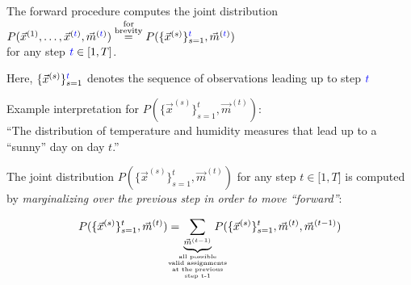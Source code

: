 \begin{frame}{\subsecname}

The forward procedure computes the joint distribution $P(\vec x^{(1)}, \ldots , \vec x^{({\color{blue}t})}, \vec m^{({\color{blue}t})}) \stackrel{\substack{\text{for}\\ \text{brevity}}}{=} P(\{\vec x^{(s)}\}_{s=1}^{{\color{blue}t}}, \vec m^{({\color{blue}t})})$\\
for any step ${\color{blue}t} \in \lbrack 1, T\rbrack$.\\

\svspace{5mm}

Here, $\{\vec x^{(s)}\}_{s=1}^{{\color{blue}t}}$ denotes the sequence of observations leading up to step ${\color{blue}t}$\\

\svspace{5mm}

Example interpretation for $P(\{\vec x^{(s)}\}_{s=1}^t, \vec m^{(t)})$:\\
``The distribution of temperature and humidity measures that lead up to a ``sunny'' day on day $t$.''

\end{frame}

\begin{frame}{\subsecname}

The joint distribution $P(\{\vec x^{(s)}\}_{s=1}^t, \vec m^{(t)})$ for any step $t \in \lbrack 1, T\rbrack$ is computed by \textit{marginalizing over the previous step in order to move ``forward''}:

\begin{equation}
P(\{\vec x^{(s)}\}_{s=1}^t, \vec m^{(t)})
=
\kern-3ex
\underbrace{
\sum_{\vec m^{(t-1)}}
}_{
\substack{
\text{\tiny all possible}\\
\text{\tiny valid assignments}\\
\text{\tiny at the previous}\\
\text{\tiny step t-1}
}
}
\kern-3ex
P(\{\vec x^{(s)}\}_{s=1}^t, \vec m^{(t)}, \vec m^{(t-1)})
\end{equation}

\end{frame}


